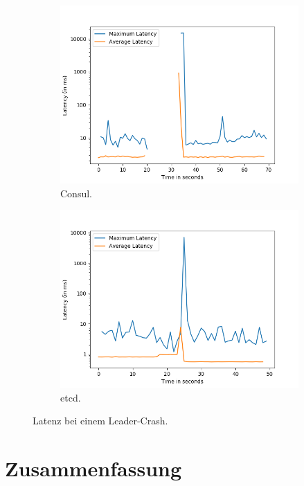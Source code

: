 \begin{figure}[t]
\begin{subfigure}[t]{0.45\textwidth}
		\includegraphics[width=\textwidth]{img/leader_crash_consul.png}
		\caption{Consul.}
	\end{subfigure}
	\begin{subfigure}[t]{0.45\textwidth}
		\includegraphics[width=\textwidth]{img/leader_crash_etcd.png}
		\caption{etcd.}
	\end{subfigure}
	\caption{Latenz bei einem Leader-Crash.}
	\label{fig:leader-crash}
\end{figure}

\section{Zusammenfassung}
\label{summary}

